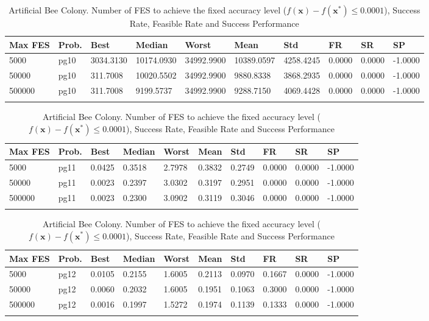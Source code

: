 \documentclass[10pt, a4paper]{book}
\begin{document}
\begin{center}
\begin{longtable}{l l l l l l l l l l}
\textbf{Max FES} & \textbf{Prob.} & \textbf{Best} & \textbf{Median} & \textbf{Worst} & \textbf{Mean} & \textbf{Std} & \textbf{FR} & \textbf{SR} & \textbf{SP} \\
\hline
5000 & pg10 & 3034.3130 & 10174.0930 & 34992.9900 & 10389.0597 & 4258.4245 & 0.0000 & 0.0000 & -1.0000 \\
50000 & pg10 & 311.7008 & 10020.5502 & 34992.9900 & 9880.8338 & 3868.2935 & 0.0000 & 0.0000 & -1.0000 \\
500000 & pg10 & 311.7008 & 9199.5737 & 34992.9900 & 9288.7150 & 4069.4428 & 0.0000 & 0.0000 & -1.0000 \\

\caption{ Artificial Bee Colony. Number of FES to achieve the fixed accuracy level ($f(\mathbf{x}) - f(\mathbf{x}^{*}) \leq 0.0001$), Success Rate, Feasible Rate and Success Performance }
\end{longtable}
\end{center}

\begin{center}
\begin{longtable}{l l l l l l l l l l}
\textbf{Max FES} & \textbf{Prob.} & \textbf{Best} & \textbf{Median} & \textbf{Worst} & \textbf{Mean} & \textbf{Std} & \textbf{FR} & \textbf{SR} & \textbf{SP} \\
\hline
5000 & pg11 & 0.0425 & 0.3518 & 2.7978 & 0.3832 & 0.2749 & 0.0000 & 0.0000 & -1.0000 \\
50000 & pg11 & 0.0023 & 0.2397 & 3.0302 & 0.3197 & 0.2951 & 0.0000 & 0.0000 & -1.0000 \\
500000 & pg11 & 0.0023 & 0.2300 & 3.0902 & 0.3119 & 0.3046 & 0.0000 & 0.0000 & -1.0000 \\

\caption{ Artificial Bee Colony. Number of FES to achieve the fixed accuracy level ($f(\mathbf{x}) - f(\mathbf{x}^{*}) \leq 0.0001$), Success Rate, Feasible Rate and Success Performance }
\end{longtable}
\end{center}

\begin{center}
\begin{longtable}{l l l l l l l l l l}
\textbf{Max FES} & \textbf{Prob.} & \textbf{Best} & \textbf{Median} & \textbf{Worst} & \textbf{Mean} & \textbf{Std} & \textbf{FR} & \textbf{SR} & \textbf{SP} \\
\hline
5000 & pg12 & 0.0105 & 0.2155 & 1.6005 & 0.2113 & 0.0970 & 0.1667 & 0.0000 & -1.0000 \\
50000 & pg12 & 0.0060 & 0.2032 & 1.6005 & 0.1951 & 0.1063 & 0.3000 & 0.0000 & -1.0000 \\
500000 & pg12 & 0.0016 & 0.1997 & 1.5272 & 0.1974 & 0.1139 & 0.1333 & 0.0000 & -1.0000 \\

\caption{ Artificial Bee Colony. Number of FES to achieve the fixed accuracy level ($f(\mathbf{x}) - f(\mathbf{x}^{*}) \leq 0.0001$), Success Rate, Feasible Rate and Success Performance }
\end{longtable}
\end{center}
\end{document}
